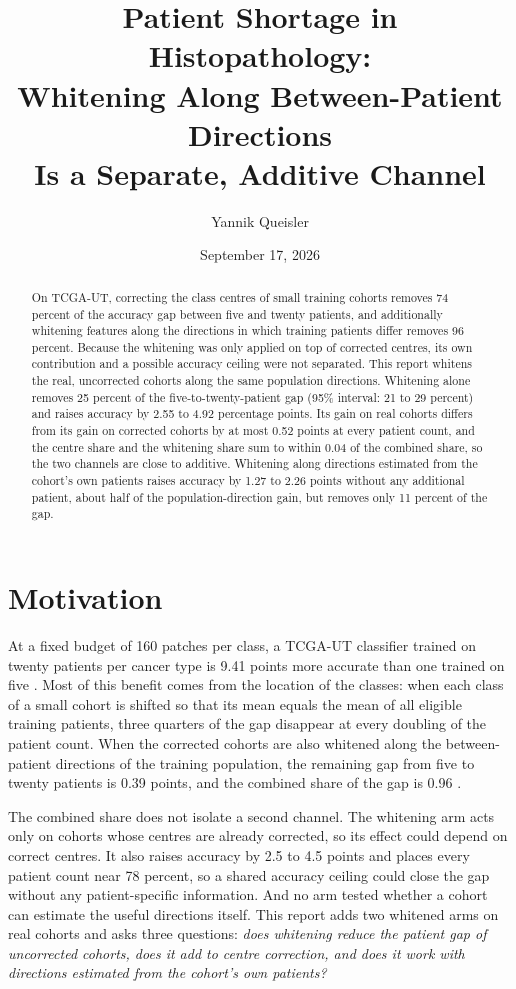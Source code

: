 \documentclass[11pt]{article}
\title{Patient Shortage in Histopathology:\\Whitening Along Between-Patient Directions\\Is a Separate, Additive Channel}
\author{Yannik Queisler}
\date{September 17, 2026}
\begin{document}
\raggedbottom
{}
\setlength{\emergencystretch}{2em}
\maketitle
\begin{abstract}
\noindent On TCGA-UT, correcting the class centres of small training cohorts removes 74 percent of the accuracy gap between five and twenty patients, and additionally whitening features along the directions in which training patients differ removes 96 percent. Because the whitening was only applied on top of corrected centres, its own contribution and a possible accuracy ceiling were not separated. This report whitens the real, uncorrected cohorts along the same population directions. Whitening alone removes 25 percent of the five-to-twenty-patient gap (95\% interval: 21 to 29 percent) and raises accuracy by 2.55 to 4.92 percentage points. Its gain on real cohorts differs from its gain on corrected cohorts by at most 0.52 points at every patient count, and the centre share and the whitening share sum to within 0.04 of the combined share, so the two channels are close to additive. Whitening along directions estimated from the cohort's own patients raises accuracy by 1.27 to 2.26 points without any additional patient, about half of the population-direction gain, but removes only 11 percent of the gap.
\end{abstract}

\section{Motivation}
\label{sec:motivation}
At a fixed budget of 160 patches per class, a TCGA-UT classifier trained on twenty patients per cancer type is 9.41 points more accurate than one trained on five \citep{queisler2026centreError}. Most of this benefit comes from the location of the classes: when each class of a small cohort is shifted so that its mean equals the mean of all eligible training patients, three quarters of the gap disappear at every doubling of the patient count. When the corrected cohorts are also whitened along the between-patient directions of the training population, the remaining gap from five to twenty patients is 0.39 points, and the combined share of the gap is 0.96 \citep{queisler2026centreError}.

The combined share does not isolate a second channel. The whitening arm acts only on cohorts whose centres are already corrected, so its effect could depend on correct centres. It also raises accuracy by 2.5 to 4.5 points and places every patient count near 78 percent, so a shared accuracy ceiling could close the gap without any patient-specific information. And no arm tested whether a cohort can estimate the useful directions itself. This report adds two whitened arms on real cohorts and asks three questions: \emph{does whitening reduce the patient gap of uncorrected cohorts, does it add to centre correction, and does it work with directions estimated from the cohort's own patients?}
\end{document}
